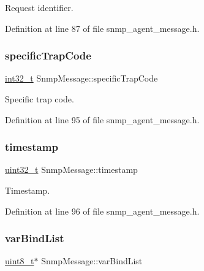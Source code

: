 Request identifier. 



Definition at line 87 of file snmp\+\_\+agent\+\_\+message.\+h.

\mbox{\label{structSnmpMessage_aca9391c4afa530ea6d4a12d48b8b424a}} 
\subsubsection{\texorpdfstring{specific\+Trap\+Code}{specificTrapCode}}
{\footnotesize\ttfamily \hyperlink{stdint_8h_ab1967d8591af1a4e48c37fd2b0f184d0}{int32\+\_\+t} Snmp\+Message\+::specific\+Trap\+Code}



Specific trap code. 



Definition at line 95 of file snmp\+\_\+agent\+\_\+message.\+h.

\mbox{\label{structSnmpMessage_afbc78f992a1722fce0dbeb050600d070}} 
\subsubsection{\texorpdfstring{timestamp}{timestamp}}
{\footnotesize\ttfamily \hyperlink{stdint_8h_a435d1572bf3f880d55459d9805097f62}{uint32\+\_\+t} Snmp\+Message\+::timestamp}



Timestamp. 



Definition at line 96 of file snmp\+\_\+agent\+\_\+message.\+h.

\mbox{\label{structSnmpMessage_a8c51e21ca5943c3dceaa76b267539bfb}} 
\subsubsection{\texorpdfstring{var\+Bind\+List}{varBindList}}
{\footnotesize\ttfamily \hyperlink{stdint_8h_aba7bc1797add20fe3efdf37ced1182c5}{uint8\+\_\+t}$\ast$ Snmp\+Message\+::var\+Bind\+List}



